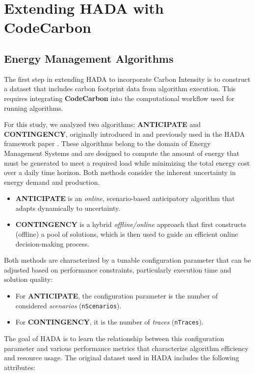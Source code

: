 \documentclass[a4paper,singleside,12pt]{report} %
\begin{document}
\section{Extending HADA with CodeCarbon}

\subsection{Energy Management Algorithms}

The first step in extending HADA to incorporate Carbon Intensity is to construct a dataset that includes carbon footprint data from 
algorithm execution. This requires integrating \textbf{CodeCarbon} into the computational workflow used for running algorithms. 

For this study, we analyzed two algorithms: \textbf{ANTICIPATE} and \textbf{CONTINGENCY}, originally introduced in 
\cite{ijcai2019p150, 10.1007/978-3-319-93031-2_8} and previously used in the HADA framework paper \cite{DEFILIPPO2022109199}. 
These algorithms belong to the domain of Energy Management Systems and are designed to compute the amount of energy 
that must be generated to meet a required load while minimizing the total energy cost over a daily time horizon. Both methods
consider the inherent uncertainty in energy demand and production.

\begin{itemize}
    \item \textbf{ANTICIPATE} is an \textit{online}, scenario-based anticipatory algorithm that adapts dynamically to uncertainty.
    \item \textbf{CONTINGENCY} is a hybrid \textit{offline/online} approach that first constructs (offline) a pool of solutions, 
    which is then used to guide an efficient online decision-making process.
\end{itemize}

Both methods are characterized by a tunable configuration parameter that can be adjusted based on performance constraints, 
particularly execution time and solution quality:
\begin{itemize}
    \item For \textbf{ANTICIPATE}, the configuration parameter is the number of considered \textit{scenarios} (\verb|nScenarios|).
    \item For \textbf{CONTINGENCY}, it is the number of \textit{traces} (\verb|nTraces|).
\end{itemize}

The goal of HADA is to learn the relationship between this configuration parameter and various performance metrics that characterize 
algorithm efficiency and resource usage. The original dataset used in HADA includes the following attributes:
\end{document}
